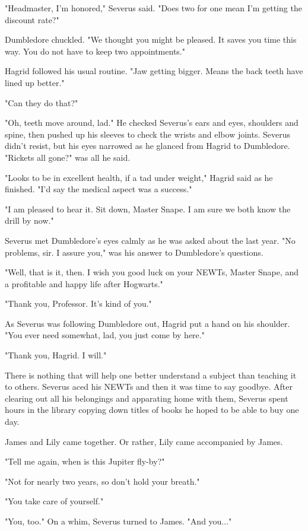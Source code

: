 \documentclass[a4paper,11pt]{article}
\begin{document}
"Headmaster, I'm honored," Severus said. "Does two for one mean I'm getting the discount rate?"

Dumbledore chuckled. "We thought you might be pleased. It saves you time this way. You do not have to keep two appointments."

Hagrid followed his usual routine. "Jaw getting bigger. Means the back teeth have lined up better."

"Can they do that?"

"Oh, teeth move around, lad." He checked Severus's ears and eyes, shoulders and spine, then pushed up his sleeves to check the wrists and elbow joints. Severus didn't resist, but his eyes narrowed as he glanced from Hagrid to Dumbledore. "Rickets all gone?" was all he said.

"Looks to be in excellent health, if a tad under weight," Hagrid said as he finished. "I'd say the medical aspect was a success."

"I am pleased to hear it. Sit down, Master Snape. I am sure we both know the drill by now."

Severus met Dumbledore's eyes calmly as he was asked about the last year. "No problems, sir. I assure you," was his answer to Dumbledore's questions.

"Well, that is it, then. I wish you good luck on your NEWTs, Master Snape, and a profitable and happy life after Hogwarts."

"Thank you, Professor. It's kind of you."

As Severus was following Dumbledore out, Hagrid put a hand on his shoulder. "You ever need somewhat, lad, you just come by here."

"Thank you, Hagrid. I will."

There is nothing that will help one better understand a subject than teaching it to others. Severus aced his NEWTs and then it was time to say goodbye. After clearing out all his belongings and apparating home with them, Severus spent hours in the library copying down titles of books he hoped to be able to buy one day.

James and Lily came together. Or rather, Lily came accompanied by James.

"Tell me again, when is this Jupiter fly-by?"

"Not for nearly two years, so don't hold your breath."

"You take care of yourself."

"You, too." On a whim, Severus turned to James. "And you..."
\end{document}
